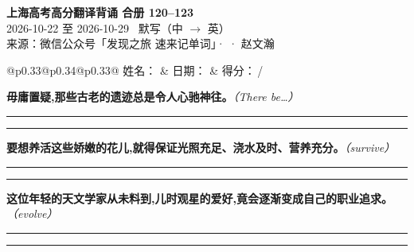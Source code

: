 \documentclass[11pt,a4paper]{article}
\newcommand{\num}[1]{\makebox[1.9em][r]{#1.}\hspace{0.3em}}
\newcommand{\wline}{\noindent\rule{\linewidth}{0.4pt}}
\newcommand{\prompt}[1]{\emph{\textcolor{tipblue}{\small（#1）}}}
\begin{document}
\pagestyle{plain}
\begin{center}
{\LARGE\bfseries 上海高考高分翻译背诵 \quad 合册 120–123}\\[0.25em]
{\large 2026-10-22 至 2026-10-29 \quad\ 默写（中 $\to$ 英）}\\[0.35em]
{\footnotesize 来源：微信公众号「发现之旅 速来记单词」·  · 赵文瀚}
\end{center}

\vspace{0.4em}
\noindent\begin{tabular}{@{}p{0.33\textwidth}@{}p{0.34\textwidth}@{}p{0.33\textwidth}@{}}
姓名：\underline{\hspace{2.0cm}} & 日期：\underline{\hspace{2.0cm}} & 得分：\underline{\hspace{1.4cm}}\,/ \\
\end{tabular}

\vspace{0.5em}

\vspace{0.8em}
\vspace{0.35em}\vspace{0.15em}

\begin{minipage}{\linewidth}

\num{1}\textbf{毋庸置疑,那些古老的遗迹总是令人心驰神往。}\prompt{There be…}

\vspace{0.3em}

\wline\vspace{0.3em}
\wline

\end{minipage}

\begin{minipage}{\linewidth}

\num{2}\textbf{要想养活这些娇嫩的花儿,就得保证光照充足、浇水及时、营养充分。}\prompt{survive}

\vspace{0.3em}

\wline\vspace{0.3em}
\wline

\end{minipage}

\begin{minipage}{\linewidth}

\num{3}\textbf{这位年轻的天文学家从未料到,儿时观星的爱好,竟会逐渐变成自己的职业追求。}\prompt{evolve}

\vspace{0.3em}

\wline\vspace{0.3em}
\wline

\end{minipage}
\end{document}
